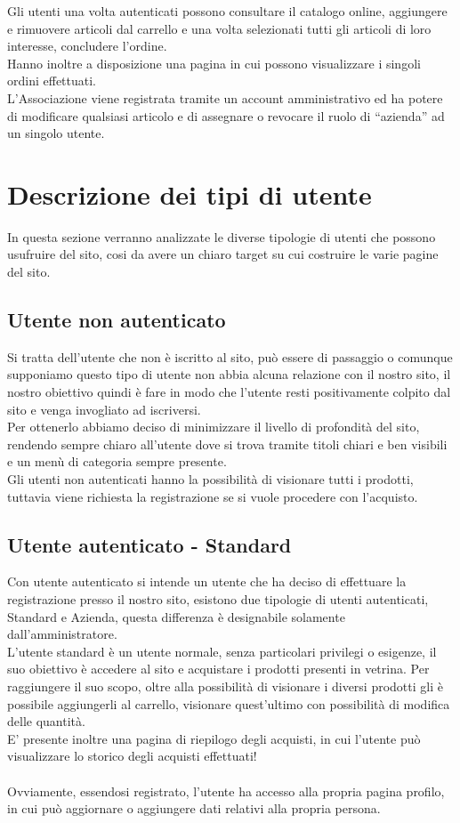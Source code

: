 Gli utenti una volta autenticati possono consultare il catalogo online, aggiungere e rimuovere articoli dal carrello e una volta selezionati tutti gli articoli di loro interesse, concludere l’ordine. \\
Hanno inoltre a disposizione una pagina in cui possono visualizzare i singoli ordini effettuati.\\

L’Associazione viene registrata tramite un account amministrativo ed ha potere di modificare qualsiasi articolo e di assegnare o revocare il ruolo di “azienda” ad un singolo utente. 
\newpage
\section{Descrizione dei tipi di utente}
In questa sezione verranno analizzate le diverse tipologie di utenti che possono usufruire del sito, cosi da avere un chiaro target su cui costruire le varie pagine del sito.
\subsection{Utente non autenticato}
	Si tratta dell'utente che non è iscritto al sito, può essere di passaggio o comunque supponiamo questo tipo di utente non abbia alcuna relazione con il nostro sito, il nostro obiettivo quindi è fare in modo che l'utente resti positivamente colpito dal sito e venga invogliato ad iscriversi.\\
	Per ottenerlo abbiamo deciso di minimizzare il livello di profondità del sito, rendendo sempre chiaro all'utente dove si trova tramite titoli chiari e ben visibili e un menù di categoria sempre presente.\\
	Gli utenti non autenticati hanno la possibilità di visionare tutti i prodotti, tuttavia viene richiesta la registrazione se si vuole procedere con l'acquisto.

\subsection{Utente autenticato - Standard}
	Con utente autenticato si intende un utente che ha deciso di effettuare la registrazione presso il nostro sito, esistono due tipologie di utenti autenticati, Standard e Azienda, questa differenza è designabile solamente dall'amministratore. \\
	L'utente standard è un utente normale, senza particolari privilegi o esigenze, il suo obiettivo è accedere al sito e acquistare i prodotti presenti in vetrina. Per raggiungere il suo scopo, oltre alla possibilità di visionare i diversi prodotti gli è possibile aggiungerli al carrello, visionare quest'ultimo con possibilità di modifica delle quantità.\\
	E' presente inoltre una pagina di riepilogo degli acquisti, in cui l'utente può visualizzare lo storico degli acquisti effettuati!\\\\
	Ovviamente, essendosi registrato, l'utente ha accesso alla propria pagina profilo, in cui può aggiornare o aggiungere dati relativi alla propria persona.

